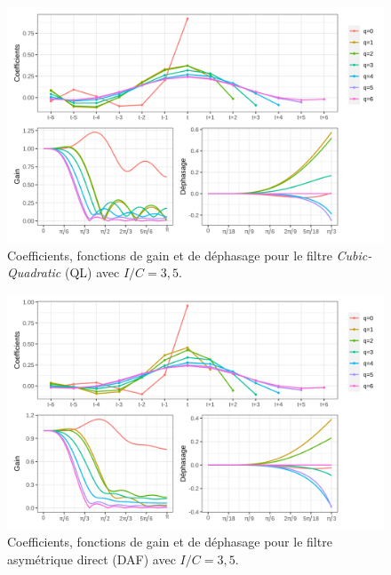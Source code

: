 \documentclass[
  11pt,
  french,
  a4paper]{article}
\newcommand\1{\mathds{1}}
\begin{document}
\begin{figure}[H]

{\centering \includegraphics[width=1\linewidth]{img/filters_used/cq} 

}

\caption[Coefficients, fonctions de gain et de déphasage pour le filtre \emph{Cubic-Quadratic} (QL) avec \(I/C=3,5\)]{Coefficients, fonctions de gain et de déphasage pour le filtre \emph{Cubic-Quadratic} (QL) avec \(I/C=3,5\).}\label{fig:graphscq}

\footnotesize
\normalsize\end{figure}

\begin{figure}[H]

{\centering \includegraphics[width=1\linewidth]{img/filters_used/daf} 

}

\caption[Coefficients, fonctions de gain et de déphasage pour le filtre asymétrique direct (DAF) avec \(I/C=3,5\)]{Coefficients, fonctions de gain et de déphasage pour le filtre asymétrique direct (DAF) avec \(I/C=3,5\).}\label{fig:graphsdaf}

\footnotesize
\normalsize\end{figure}
\end{document}
